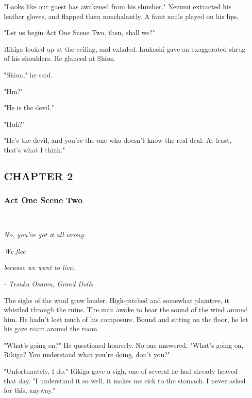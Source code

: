 "Looks like our guest has awakened from his slumber." Nezumi extracted
his leather gloves, and flapped them nonchalantly. A faint smile played
on his lips.

"Let us begin Act One Scene Two, then, shall we?"

Rikiga looked up at the ceiling, and exhaled. Inukashi gave an
exaggerated shrug of his shoulders. He glanced at Shion.

"Shion," he said.

"Hm?"

"He is the devil."

"Huh?"

"He's the devil, and you're the one who doesn't know the real deal. At
least, that's what I think."

\hypertarget{index_split_001_split_002.htmlux5cux23calibre_pb_25}{}

\protect\hypertarget{index_split_025.html}{}{}

\hypertarget{index_split_025.htmlux5cux23calibre_pb_0}{}

\hypertarget{index_split_025.htmlux5cux23calibre_toc_3}{%
\subsection{CHAPTER 2}\label{index_split_025.htmlux5cux23calibre_toc_3}}

\subsubsection{Act One Scene Two}

\emph{\\
}

\emph{No, you've got it all wrong.}

\emph{We flee}

\emph{because we want to live.}

\emph{- Tezuka Osamu, Grand Dolls}

The sighs of the wind grew louder. High-pitched and somewhat plaintive,
it whistled through the ruins. The man awoke to hear the sound of the
wind around him. He hadn't lost much of his composure. Bound and sitting
on the floor, he let his gaze roam around the room.

"What's going on?" He questioned hoarsely. No one answered. "What's
going on, Rikiga? You understand what you're doing, don't you?"

"Unfortunately, I do." Rikiga gave a sigh, one of several he had already
heaved that day. "I understand it so well, it makes me sick to the
stomach. I never asked for this, anyway."~

